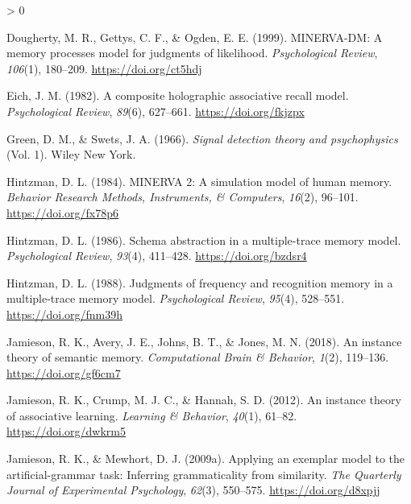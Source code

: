 \documentclass[
  english,
  man,floatsintext]{apa6}
\newlength{\cslhangindent}
\newenvironment{CSLReferences}[2] %
 {%
  \setlength{\parindent}{0pt}
  \ifodd #1 \everypar{\setlength{\hangindent}{\cslhangindent}}\ignorespaces\fi
  \ifnum #2 > 0
  \setlength{\parskip}{#2\baselineskip}
  \fi
 }%
 {}
\begin{document}
\begin{CSLReferences}{1}{0}
\leavevmode\hypertarget{ref-doughertyMINERVADMMemoryProcesses1999}{}%
Dougherty, M. R., Gettys, C. F., \& Ogden, E. E. (1999). {MINERVA}-{DM}: {A} memory processes model for judgments of likelihood. \emph{Psychological Review}, \emph{106}(1), 180--209. \url{https://doi.org/ct5hdj}

\leavevmode\hypertarget{ref-eichCompositeHolographicAssociative1982}{}%
Eich, J. M. (1982). A composite holographic associative recall model. \emph{Psychological Review}, \emph{89}(6), 627--661. \url{https://doi.org/fkjzpx}

\leavevmode\hypertarget{ref-greenSignalDetectionTheory1966}{}%
Green, D. M., \& Swets, J. A. (1966). \emph{Signal detection theory and psychophysics} (Vol. 1). {Wiley New York}.

\leavevmode\hypertarget{ref-hintzmanMINERVASimulationModel1984}{}%
Hintzman, D. L. (1984). {MINERVA} 2: {A} simulation model of human memory. \emph{Behavior Research Methods, Instruments, \& Computers}, \emph{16}(2), 96--101. \url{https://doi.org/fx78p6}

\leavevmode\hypertarget{ref-hintzmanSchemaAbstractionMultipletrace1986}{}%
Hintzman, D. L. (1986). Schema abstraction in a multiple-trace memory model. \emph{Psychological Review}, \emph{93}(4), 411--428. \url{https://doi.org/bzdsr4}

\leavevmode\hypertarget{ref-hintzmanJudgmentsFrequencyRecognition1988}{}%
Hintzman, D. L. (1988). Judgments of frequency and recognition memory in a multiple-trace memory model. \emph{Psychological Review}, \emph{95}(4), 528--551. \url{https://doi.org/fnm39h}

\leavevmode\hypertarget{ref-jamiesonInstanceTheorySemantic2018}{}%
Jamieson, R. K., Avery, J. E., Johns, B. T., \& Jones, M. N. (2018). An instance theory of semantic memory. \emph{Computational Brain \& Behavior}, \emph{1}(2), 119--136. \url{https://doi.org/gf6cm7}

\leavevmode\hypertarget{ref-jamiesonInstanceTheoryAssociative2012}{}%
Jamieson, R. K., Crump, M. J. C., \& Hannah, S. D. (2012). An instance theory of associative learning. \emph{Learning \& Behavior}, \emph{40}(1), 61--82. \url{https://doi.org/dwkrm5}

\leavevmode\hypertarget{ref-jamiesonApplyingExemplarModel2009}{}%
Jamieson, R. K., \& Mewhort, D. J. (2009a). Applying an exemplar model to the artificial-grammar task: {Inferring} grammaticality from similarity. \emph{The Quarterly Journal of Experimental Psychology}, \emph{62}(3), 550--575. \url{https://doi.org/d8xpjj}


\end{CSLReferences}
\end{document}
